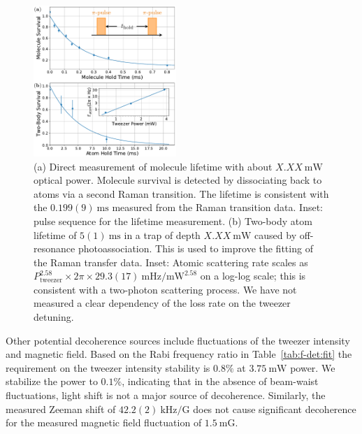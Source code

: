 \documentclass[aps,prl,twocolumn,10pt,superscriptaddress]{revtex4-1}
\begin{document}
\begin{figure}[t!]
  \includegraphics[width=0.48\textwidth]{imgs/fig-lifetime.pdf}
  \caption{
    (a) Direct measurement of molecule lifetime with about $X.XX~\mathrm{mW}$ optical power.
    Molecule survival is detected by dissociating back to atoms via a second Raman transition.
    The lifetime is consistent with the $0.199(9)~\mathrm{ms}$
    measured from the Raman transition data.
    Inset: pulse sequence for the lifetime measurement.
    (b) Two-body atom lifetime of $5(1)~\mathrm{ms}$
    in a trap of depth $X.XX~\mathrm{mW}$ caused by off-resonance photoassociation.
    This is used to improve the fitting of the Raman transfer data.
    Inset: Atomic scattering rate scales as
    $P_\textrm{tweezer}^{2.58}\times\!2\pi\!\times29.3(17)~\mathrm{mHz/mW^{2.58}}$ on a log-log scale;
    this is consistent with a two-photon scattering process.
    We have not measured a clear dependency of the loss rate on the tweezer detuning.
    \label{f-lifetime}}
\end{figure}
Other potential decoherence sources include
fluctuations of the tweezer intensity and magnetic field.
Based on the Rabi frequency ratio in Table~\ref{tab:f-det:fit}
the requirement on the tweezer intensity stability is $0.8\mathrm{\%}$ at $3.75~\mathrm{mW}$ power. We stabilize the power to $0.1\mathrm{\%}$, indicating that in the absence of beam-waist fluctuations, light shift is not a major source of decoherence.
Similarly, the measured Zeeman shift of $42.2(2)~\mathrm{kHz/G}$
does not cause significant decoherence for the measured magnetic field
fluctuation of $1.5~\mathrm{mG}$.

\end{document}

